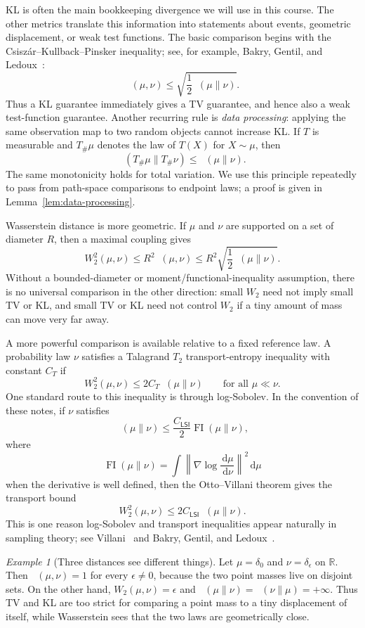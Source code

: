 \documentclass{amsart}
\numberwithin{equation}{section}
\theoremstyle{plain}
\theoremstyle{definition}
\theoremstyle{remark}
\newtheorem*{example}{Example}
\DeclareMathOperator{\KL}{D_{\mathsf{KL}}}
\DeclareMathOperator{\TV}{D_{\mathsf{TV}}}
\DeclareMathOperator{\FI}{FI}
\newcommand{\R}{\mathbb{R}}
\newcommand{\dd}{\,\mathrm{d}}
\newcommand{\norm}[1]{\left\lVert #1 \right\rVert}
\begin{document}
KL is often the main bookkeeping divergence we will use in this course.  The other metrics translate this information into statements
about events, geometric displacement, or weak test functions.
The basic comparison begins with the Csisz\'ar--Kullback--Pinsker inequality;
see, for example, Bakry, Gentil, and Ledoux~\cite{bakry2014analysis}:
\[
    \TV(\mu,\nu)
    \leq
    \sqrt{\frac12\KL(\mu\|\nu)}.
\]
Thus a KL guarantee immediately gives a TV guarantee, and hence also a weak
test-function guarantee.  Another recurring rule is \emph{data processing}:
applying the same observation map to two random objects cannot increase KL\@.  If
$T$ is measurable and $T_\#\mu$ denotes the law of $T(X)$ for $X\sim\mu$, then
\[
    \KL(T_\#\mu\|T_\#\nu)\leq \KL(\mu\|\nu).
\]
The same monotonicity holds for total variation.  We use this principle
repeatedly to pass from path-space comparisons to endpoint laws; a proof is
given in Lemma~\ref{lem:data-processing}.

Wasserstein distance is more geometric.  If $\mu$
and $\nu$ are supported on a set of diameter $R$, then a maximal coupling gives
\[
    W_2^2(\mu,\nu)
    \leq
    R^2\TV(\mu,\nu)
    \leq
    R^2\sqrt{\frac12\KL(\mu\|\nu)}.
\]
Without a bounded-diameter or moment/functional-inequality assumption, there
is no universal comparison in the other direction: small $W_2$ need not imply
small TV or KL, and small TV or KL need not control $W_2$ if a tiny amount of
mass can move very far away.

A more powerful comparison is available relative to a fixed reference law.  A
probability law $\nu$ satisfies a Talagrand $T_2$ transport-entropy inequality
with constant $C_T$ if
\[
    W_2^2(\mu,\nu)\leq 2C_T\KL(\mu\|\nu)
    \qquad\text{for all }\mu\ll\nu.
\]
One standard route to this inequality is through log-Sobolev.  In the convention
of these notes, if $\nu$ satisfies
\[
    \KL(\mu\|\nu)
    \leq
    \frac{C_{\mathsf{LSI}}}{2}\FI(\mu\|\nu),
\]
where
\[
    \FI(\mu\|\nu)
    =
    \int \norm{\nabla\log\frac{\dd\mu}{\dd\nu}}^2\dd\mu
\]
when the derivative is well defined, then the Otto--Villani theorem gives
the transport bound
\[
    W_2^2(\mu,\nu)\leq 2C_{\mathsf{LSI}}\KL(\mu\|\nu).
\]
This is one reason log-Sobolev and transport inequalities appear naturally in
sampling theory; see Villani~\cite{villani2009optimal} and Bakry, Gentil, and
Ledoux~\cite{bakry2014analysis}.

\begin{example}[Three distances see different things]
Let $\mu=\delta_0$ and $\nu=\delta_\epsilon$ on $\R$.  Then
$\TV(\mu,\nu)=1$ for every $\epsilon\neq0$, because the two point masses live
on disjoint sets.  On the other hand, $W_2(\mu,\nu)=\epsilon$ and
$\KL(\mu\|\nu)=\KL(\nu\|\mu)=+\infty$.  Thus TV and KL are too strict for
comparing a point mass to a tiny displacement of itself, while Wasserstein
sees that the two laws are geometrically close.
\end{example}
\end{document}
